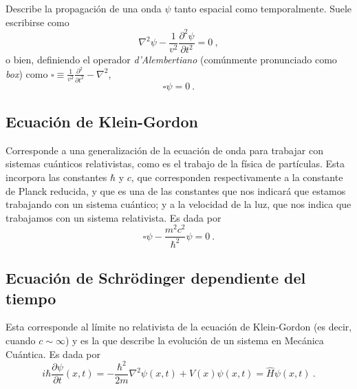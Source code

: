Describe la propagación de una onda $\psi$ tanto espacial como temporalmente. Suele escribirse como
\begin{equation}
    \nabla^2 \psi - \frac{1}{v^2}\frac{\partial^2 \psi}{\partial t^2} = 0 \ ,
\end{equation}
o bien, definiendo el operador \emph{d'Alembertiano} (comúnmente pronunciado como \emph{box}) como $\square \equiv \frac{1}{v^2} \frac{\partial^2}{\partial t^2} - \nabla^2$,
\begin{equation}
    \square \psi = 0 \ .
\end{equation}

\subsection{Ecuación de Klein-Gordon}

Corresponde a una generalización de la ecuación de onda para trabajar con sistemas cuánticos relativistas, como es el trabajo de la física de partículas. Esta incorpora las constantes $\hbar$ y $c$, que corresponden respectivamente a la constante de Planck reducida, y que es una de las constantes que nos indicará que estamos trabajando con un sistema cuántico; y a la velocidad de la luz, que nos indica que trabajamos con un sistema relativista. Es dada por
\begin{equation}
    \square \psi - \frac{m^2c^2}{\hbar^2}\psi = 0 \ .
\end{equation}


\subsection{Ecuación de Schrödinger dependiente del tiempo}
Esta corresponde al límite no relativista de la ecuación de Klein-Gordon (es decir, cuando $c \sim \infty$) y es la que describe la evolución de un sistema en Mecánica Cuántica. Es dada por
\begin{equation}
    i \hbar \frac{\partial \psi}{\partial t}(x,t) = -\frac{\hbar^2}{2m} \nabla^2 \psi(x,t) + V(x) \psi(x,t) = \hat{H}\psi(x,t) \ .
\end{equation}



